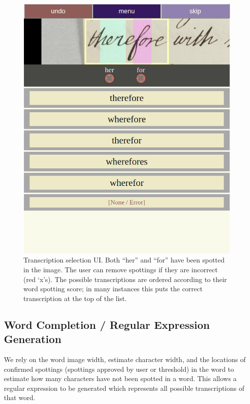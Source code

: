 \documentclass[ms,electronic,twosidetoc,letterpaper,chaptercenter,parttop,lol,lof,lot]{byumsphd}
\begin{document}
\begin{figure}
    \centering
    \includegraphics[width=.75\textwidth]{transcriptionselection}
    \caption{Transcription selection UI.  Both ``her'' and ``for'' have been spotted in the image. The user can remove spottings if they are incorrect (red `x's). The possible transcriptions are ordered according to their word spotting score; in many instances this puts the correct transcription at the top of the list.
    }
    \label{fig:transcriptionselection}
\end{figure}




\subsection{Word Completion / Regular Expression Generation}\label{wordcompletion}
We rely on the word image width, estimate character width, and the locations of confirmed spottings (spottings approved by user or threshold) in the word to estimate how many characters have not been spotted in a word. This allows a regular expression to be generated which represents all possible transcriptions of that word.
\end{document}
